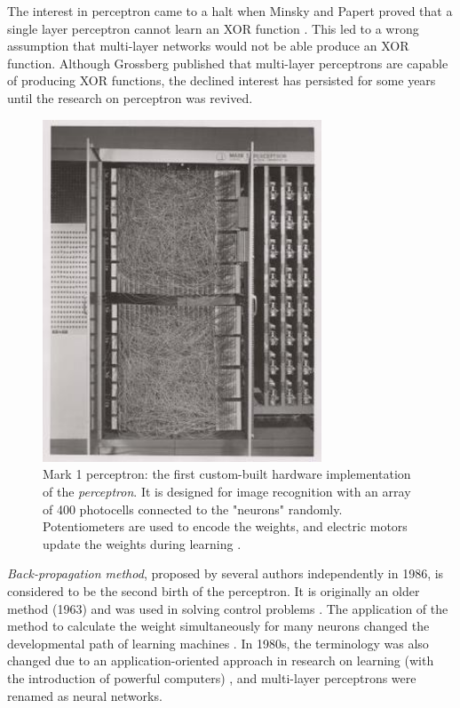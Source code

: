 The interest in perceptron came to a halt when Minsky and Papert proved that a single layer perceptron cannot learn an XOR function \cite{minsky1969perceptron}.
This led to a wrong assumption that multi-layer networks would not be able produce an XOR function. Although Grossberg published that multi-layer perceptrons are capable of producing XOR functions, the declined interest has persisted for some years until the research on perceptron was revived.


\begin{figure}
\begin{center}
\includegraphics[width=8.3cm]{figures/Mark_I_perceptron}
\caption{Mark 1 perceptron: the first custom-built hardware implementation of the \emph{perceptron}. It is designed for image recognition with an array of 400 photocells connected to the "neurons" randomly.  Potentiometers are used to encode the weights, and electric motors update the weights during learning \cite{bishop2006pattern}.} 
\label{fig:Mark_I_perceptron}
\end{center}
\end{figure}


\emph{Back-propagation method}, proposed by several authors \cite{le1986learning,rumelhart1986learning} independently in 1986, is considered to be the second birth of the perceptron. It is originally an older method (1963) \cite{bryson1963optimal} and was used in solving control problems \cite{vapnik2013nature}. The application of the method to calculate the weight simultaneously for many neurons changed the developmental path of learning machines \cite{vapnik2013nature}. In 1980s, the terminology was also changed due to an application-oriented approach in research on learning (with the introduction of powerful computers) \cite{vapnik2013nature}, and multi-layer perceptrons were renamed as neural networks.

